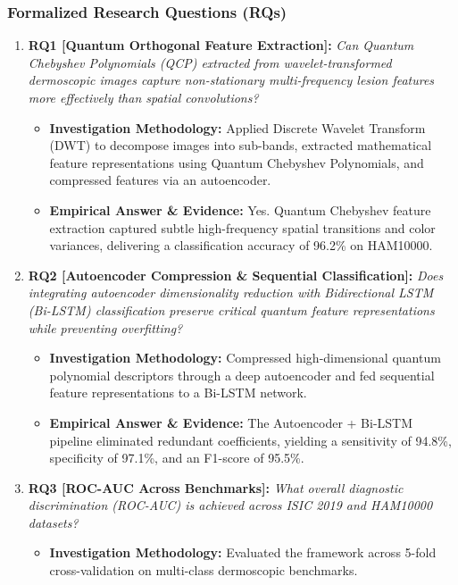 \subsubsection*{Formalized Research Questions (RQs)}
\begin{enumerate}[label=\textbf{\arabic*.}, leftmargin=*]
  \item \textbf{RQ1 [Quantum Orthogonal Feature Extraction]:} \textit{Can Quantum Chebyshev Polynomials (QCP) extracted from wavelet-transformed dermoscopic images capture non-stationary multi-frequency lesion features more effectively than spatial convolutions?}
  \begin{itemize}[leftmargin=1.5em]
    \item \textbf{Investigation Methodology:} Applied Discrete Wavelet Transform (DWT) to decompose images into sub-bands, extracted mathematical feature representations using Quantum Chebyshev Polynomials, and compressed features via an autoencoder.
    \item \textbf{Empirical Answer \& Evidence:} Yes. Quantum Chebyshev feature extraction captured subtle high-frequency spatial transitions and color variances, delivering a classification accuracy of 96.2\% on HAM10000.
  \end{itemize}
  \item \textbf{RQ2 [Autoencoder Compression \& Sequential Classification]:} \textit{Does integrating autoencoder dimensionality reduction with Bidirectional LSTM (Bi-LSTM) classification preserve critical quantum feature representations while preventing overfitting?}
  \begin{itemize}[leftmargin=1.5em]
    \item \textbf{Investigation Methodology:} Compressed high-dimensional quantum polynomial descriptors through a deep autoencoder and fed sequential feature representations to a Bi-LSTM network.
    \item \textbf{Empirical Answer \& Evidence:} The Autoencoder + Bi-LSTM pipeline eliminated redundant coefficients, yielding a sensitivity of 94.8\%, specificity of 97.1\%, and an F1-score of 95.5\%.
  \end{itemize}
  \item \textbf{RQ3 [ROC-AUC Across Benchmarks]:} \textit{What overall diagnostic discrimination (ROC-AUC) is achieved across ISIC 2019 and HAM10000 datasets?}
  \begin{itemize}[leftmargin=1.5em]
    \item \textbf{Investigation Methodology:} Evaluated the framework across 5-fold cross-validation on multi-class dermoscopic benchmarks.

\end{itemize}
\end{enumerate}
